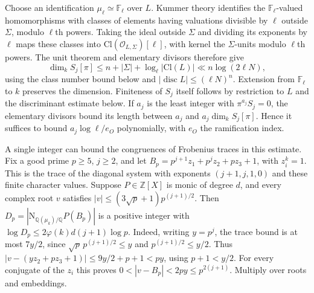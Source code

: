 \documentclass[11pt]{amsart}
\theoremstyle{definition}
\theoremstyle{remark}
\begin{document}
Choose an identification $\mu_\ell\simeq\mathbb F_\ell$ over $L$.
Kummer theory identifies the $\mathbb F_\ell$-valued homomorphisms
with classes of elements having valuations divisible by $\ell$
outside $\Sigma$, modulo $\ell$th powers. Taking the ideal outside
$\Sigma$ and dividing its exponents by $\ell$ maps these classes
into $\mathrm{Cl}(\mathcal O_{L,\Sigma})[\ell]$, with kernel the
$\Sigma$-units modulo $\ell$th powers. The unit theorem and elementary
divisors therefore give
\[
 \dim_k S_j[\pi]\le n+|\Sigma|+\log_\ell |\mathrm{Cl}(L)|
 \ll n\log(2\ell N),
\]
using the class number bound below and
$|\operatorname{disc}L|\le(\ell N)^n$. Extension from
$\mathbb F_\ell$ to $k$ preserves the dimension. Finiteness of $S_j$
itself follows by restriction to $L$ and the discriminant estimate
below. If $a_j$ is the least integer with $\pi^{a_j}S_j=0$, the
elementary divisors bound its length between $a_j$ and
$a_j\dim_k S_j[\pi]$. Hence it suffices to bound $a_j\log\ell/e_O$
polynomially, with $e_O$ the ramification index.

A single integer can bound the congruences of Frobenius traces
in this estimate. Fix a good prime $p\ge5$, $j\ge2$, and let
$B_p=p^{j+1}z_1+p^jz_2+pz_3+1$, with $z_i^k=1$.
This is the trace of the diagonal system with exponents $(j+1,j,1,0)$
and these finite character values. Suppose $P\in\mathbb Z[X]$ is monic
of degree $d$, and every complex root $v$ satisfies
$|v|\le(3\sqrt p+1)p^{(j+1)/2}$. Then
$D_p=|\mathrm N_{\mathbb Q(\mu_k)/\mathbb Q}P(B_p)|$ is a positive
integer with $\log D_p\le 2\varphi(k)d(j+1)\log p$. Indeed, writing
$y=p^j$, the trace bound is at most $7y/2$, since
$\sqrt p\,p^{(j+1)/2}\le y$ and $p^{(j+1)/2}\le y/2$.
Thus $|v-(yz_2+pz_3+1)|\le 9y/2+p+1<py$,
using $p+1<y/2$. For every conjugate of the $z_i$ this proves
$0<|v-B_p|<2py\le p^{2(j+1)}$. Multiply over roots and embeddings.
\end{document}
